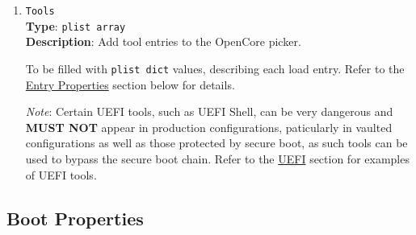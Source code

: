 \documentclass[]{article}
\begin{document}
\begin{enumerate}
\item
  \texttt{Tools}\label{misctools}\\
  \textbf{Type}: \texttt{plist\ array}\\
  \textbf{Description}: Add tool entries to the OpenCore picker.

  To be filled with \texttt{plist\ dict} values, describing each load entry.
  Refer to the \hyperref[miscentryprops]{Entry Properties} section below for details.

  \emph{Note}: Certain UEFI tools, such as UEFI Shell, can be very dangerous and
  \textbf{MUST NOT} appear in production configurations, paticularly in vaulted
  configurations as well as those protected by secure boot, as such tools can be
  used to bypass the secure boot chain.
  Refer to the \hyperref[uefitools]{UEFI} section for examples of UEFI tools.

\end{enumerate}

\subsection{Boot Properties}\label{miscbootprops}
\end{document}
